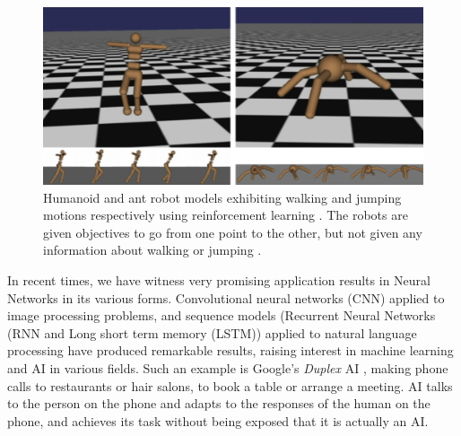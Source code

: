 \begin{figure}
\begin{center}
\includegraphics[width=13.3cm]{figures/deepmindWalking}
\caption{Humanoid and ant robot models \cite{deepmindHumonoidWalkingStanford} exhibiting walking and jumping motions respectively using reinforcement learning \cite{deepmindWebsiteHumonoidWalking}. The robots are given objectives to go from one point to the other, but not given any information about walking or jumping \cite{deepmindHumonoidWalkingVideo}.} 
\label{fig:deepmindWalking}
\end{center}
\end{figure}

In recent times, we have witness very promising application results in Neural Networks in its various forms. Convolutional neural networks (CNN) applied to image processing problems, and sequence models (Recurrent Neural Networks (RNN and Long short term memory (LSTM)) applied to natural language processing have produced remarkable results, raising interest in machine learning and AI in various fields. Such an example is Google's \emph{Duplex} AI \cite{googleDuplex}, making phone calls to restaurants or hair salons, to book a table or arrange a meeting.  AI talks to the person on the phone and adapts to the responses of the human on the phone, and achieves its task without being exposed that it is actually an AI.




